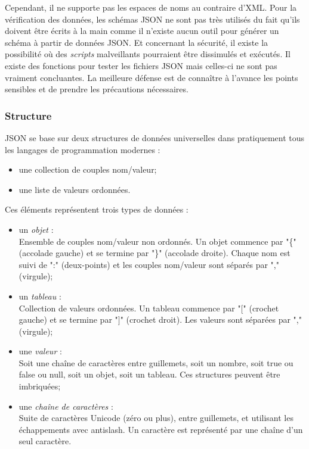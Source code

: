 Cependant, il ne supporte pas les espaces de noms au contraire d'XML.
Pour la v\'erification des donn\'ees, les sch\'emas JSON ne sont pas tr\`es utilis\'es du fait qu'ils doivent \^etre \'ecrits \`a la main comme il n'existe aucun outil pour g\'en\'erer un sch\'ema \`a partir de donn\'ees JSON.
Et concernant la s\'ecurit\'e, il existe la possibilit\'e o\`u des \textit{scripts} malveillants pourraient \^etre dissimul\'es et ex\'ecut\'es.
Il existe des fonctions pour tester les fichiers JSON mais celles-ci ne sont pas vraiment concluantes.
La meilleure d\'efense est de conna\^itre \`a l'avance les points sensibles et de prendre les pr\'ecautions n\'ecessaires.

\subsubsection{Structure}

JSON se base sur deux structures de donn\'ees universelles dans pratiquement tous les langages de programmation modernes :

\begin{itemize}
	\item une collection de couples nom/valeur;
	\item une liste de valeurs ordonn\'ees.

\end{itemize}

\vspace{0.20cm}

\noindent Ces \'el\'ements repr\'esentent trois types de donn\'ees :

\begin{itemize}
	\item un \textit{objet} :\\Ensemble de couples nom/valeur non ordonn\'es. Un objet commence par \textsf{"\{" (accolade gauche)} et se termine par \textsf{"\}" (accolade droite)}.
	Chaque nom est suivi de \textsf{":" (deux-points)} et les couples nom/valeur sont s\'epar\'es par \textsf{"," (virgule)};
	\item un \textit{tableau} :\\Collection de valeurs ordonn\'ees. Un tableau commence par \textsf{"$[$" (crochet gauche)} et se termine par \textsf{"$]$" (crochet droit)}.
	Les valeurs sont s\'epar\'ees par \textsf{"," (virgule)};
	\item une \textit{valeur} :\\Soit une \textsf{cha\^ine de caract\`eres} entre guillemets, soit un \textsf{nombre}, soit \textsf{true} ou \textsf{false} ou \textsf{null}, soit un \textsf{objet}, soit un \textsf{tableau}.
	Ces structures peuvent \^etre imbriqu\'ees;
	\item une \textit{cha\^ine de caract\`eres} :\\Suite de caract\`eres Unicode (z\'ero ou plus), entre guillemets, et utilisant les \'echappements avec antislash. 
	Un caract\`ere est repr\'esent\'e par une cha\^ine d'un seul caract\`ere.

\end{itemize}



